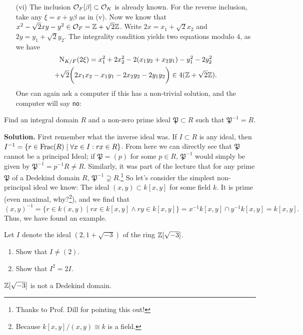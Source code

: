 \documentclass[a4paper,11pt]{article}
\begin{document}
\begin{enumerate}[labelindent=0pt, wide]
    \item[(vi)] The inclusion $\mathcal{O}_F[\beta] \subset \mathcal{O}_K$ is already
        known. For the reverse inclusion, take any $\xi = x + y\beta$ as in (v).
        Now we know that $x^2 - \sqrt 2 xy - y^2 \in \mathcal{O}_F = \mathbb{Z} + \sqrt 2 \mathbb{Z}$. 
        Write $2x = x_1 + \sqrt 2 x_2$ and $2y= y_1 + \sqrt 2 y_2$. The integrality 
        condition yields two equations modulo $4$, as we have
        \begin{multline*}
            \operatorname{N}_{K/F}(2\xi) = x_1^2 + 2x_2^2 - 2(x_1 y_2 + x_2 y_1) - y_1^2 -
            2y_2^2 \\ 
            + \sqrt 2\bigg ( 2x_1x_2 - x_1 y_1 - 2x_2y_2 -2y_1y_2 \bigg) \in
            4(\mathbb{Z} +
            \sqrt 2 \mathbb{Z}).
        \end{multline*}
        One can again ask a computer if this has a non-trivial solution, and the
        computer will say \texttt{no}:
        
        

\end{enumerate}

 Find an integral domain $R$ and a non-zero prime ideal
$\mathfrak P \subset R$ such that $\mathfrak P^{-1} = R$.

\textbf{Solution.}
First remember what the inverse ideal was. If $I \subset R$ is any ideal, 
then $I^{-1} = \{r \in \mathrm{Frac}(R) \mid \forall x \in I: r x \in R  \}$. From here
we can directly see that $\mathfrak P$ cannot be a principal Ideal; if 
$\mathfrak P = (p)$ for some $p \in R$, $\mathfrak P^{-1}$ would simply be given
by $\mathfrak P^{-1}= p^{-1} R \neq R$. Similarly, it was part of the lecture
that for any prime $\mathfrak P$ of a Dedekind domain $R$, $\mathfrak P^{-1}
\supsetneq R$.\footnote{Thanks to Prof. Dill for pointing this out!} So let's
consider the simplest non-principal ideal we know: The ideal $(x,y) \subset
k[x,y]$ for some field $k$. 
It is prime (even maximal, why?\footnote{Because $k[x,y]/(x,y) \cong k$ is a
field.}), and we find that
\begin{equation*}
    (x,y)^{-1} = \{r \in k(x,y) \mid rx \in k[x,y] \wedge ry \in k[x,y]\}
    = x^{-1}k[x,y] \cap y^{-1}k[x,y] = k[x,y].
\end{equation*}
Thus, we have found an example.


 Let $I$ denote the ideal $(2, 1 + \sqrt{-3})$ of the ring
$\mathbb{Z}[\sqrt{-3}]$. 
\begin{enumerate}
    \item Show that $I \neq (2)$. 
    \item Show that $I^2 = 2I$. 
\end{enumerate}
$\mathbb{Z}[\sqrt{-3}]$ is not a Dedekind domain.
\end{document}
